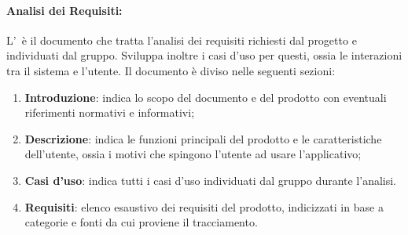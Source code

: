 \paragraph{Analisi dei Requisiti:}
L'\AdR\ è il documento che tratta l'analisi dei requisiti richiesti dal progetto e individuati dal gruppo. Sviluppa inoltre i casi d'uso per questi, ossia le interazioni tra il sistema e l'utente.
Il documento è diviso nelle seguenti sezioni:
\begin{enumerate}
  \item \textbf{Introduzione}: indica lo scopo del documento e del prodotto con eventuali riferimenti normativi e informativi;
  \item \textbf{Descrizione}: indica le funzioni principali del prodotto e le caratteristiche dell'utente, ossia i motivi che spingono l'utente ad usare l'applicativo;
  \item \textbf{Casi d'uso}: indica tutti i casi d'uso individuati dal gruppo durante l'analisi.
  \item \textbf{Requisiti}: elenco esaustivo dei requisiti del prodotto, indicizzati in base a categorie e fonti da cui proviene il tracciamento.
\end{enumerate}

